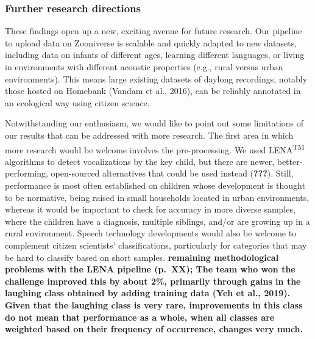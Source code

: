 \documentclass[english,,man]{apa6}
\begin{document}
\hypertarget{further-research-directions}{%
\subsubsection{Further research directions}\label{further-research-directions}}

These findings open up a new, exciting avenue for future research. Our pipeline to upload data on Zooniverse is scalable and quickly adapted to new datasets, including data on infants of different ages, learning different languages, or living in environments with different acoustic properties (e.g., rural versus urban environments). This means large existing datasets of daylong recordings, notably those hosted on Homebank (Vandam et al., 2016), can be reliably annotated in an ecological way using citizen science.

Notwithstanding our enthusiasm, we would like to point out some limitations of our results that can be addressed with more research. The first area in which more research would be welcome involves the pre-processing. We used LENA\textsuperscript{TM} algorithms to detect vocalizations by the key child, but there are newer, better-performing, open-sourced alternatives that could be used instead ({\textbf{???}}). Still, performance is most often established on children whose development is thought to be normative, being raised in small households located in urban environments, whereas it would be important to check for accuracy in more diverse samples, where the children have a diagnosis, multiple siblings, and/or are growing up in a rural environment. Speech technology developments would also be welcome to complement citizen scientists' classifications, particularly for categories that may be hard to classify based on short samples. \textbf{remaining methodological problems with the LENA pipeline (p.~XX); The team who won the challenge improved this by about 2\%, primarily through gains in the laughing class obtained by adding training data (Yeh et al., 2019). Given that the laughing class is very rare, improvements in this class do not mean that performance as a whole, when all classes are weighted based on their frequency of occurrence, changes very much. }
\end{document}
